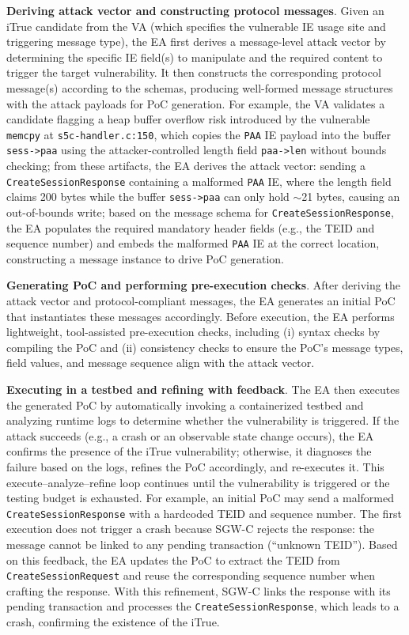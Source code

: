 \vspace{2pt}\noindent\textbf{Deriving attack vector and constructing protocol messages}. 
Given an iTrue candidate from the VA (which specifies the vulnerable IE usage site and triggering message type), the EA first derives a message-level attack vector by determining the specific IE field(s) to manipulate and the required content to trigger the target vulnerability. It then constructs the corresponding protocol message(s) according to the schemas, producing well-formed message structures with the attack payloads for PoC generation.
For example, the VA validates a candidate flagging a heap buffer overflow risk introduced by the vulnerable \texttt{memcpy} at \texttt{s5c-handler.c:150}, which copies the \texttt{PAA} IE payload into the buffer \texttt{sess->paa} using the attacker-controlled length field \texttt{paa->len} without bounds checking; from these artifacts, the EA derives the attack vector: sending a \texttt{CreateSessionResponse} containing a malformed \texttt{PAA} IE, where the length field claims 200 bytes while the buffer \texttt{sess->paa} can only hold $\sim$21 bytes, causing an out-of-bounds write; based on the message schema for \texttt{CreateSessionResponse}, the EA populates the required mandatory header fields (e.g., the TEID and sequence number) and embeds the malformed \texttt{PAA} IE at the correct location, constructing a message instance to drive PoC generation.

\vspace{2pt}\noindent\textbf{Generating PoC and performing pre-execution checks}. 
After deriving the attack vector and protocol-compliant messages, the EA generates an initial PoC that instantiates these messages accordingly. Before execution, the EA performs lightweight, tool-assisted pre-execution checks, including (i) syntax checks by compiling the PoC and (ii) consistency checks to ensure the PoC’s message types, field values, and message sequence align with the attack vector.

\vspace{2pt}\noindent\textbf{Executing in a testbed and refining with feedback}. 
The EA then executes the generated PoC by automatically invoking a containerized testbed and analyzing runtime logs to determine whether the vulnerability is triggered. If the attack succeeds (e.g., a crash or an observable state change occurs), the EA confirms the presence of the iTrue vulnerability; otherwise, it diagnoses the failure based on the logs, refines the PoC accordingly, and re-executes it. This execute--analyze--refine loop continues until the vulnerability is triggered or the testing budget is exhausted. For example, an initial PoC may send a malformed \texttt{CreateSessionResponse} with a hardcoded TEID and sequence number. The first execution does not trigger a crash because SGW-C rejects the response: the message cannot be linked to any pending transaction (``unknown TEID''). Based on this feedback, the EA updates the PoC to extract the TEID from \texttt{CreateSessionRequest} and reuse the corresponding sequence number when crafting the response. With this refinement, SGW-C links the response with its pending transaction and processes the \texttt{CreateSessionResponse}, which leads to a crash, confirming the existence of the iTrue.
